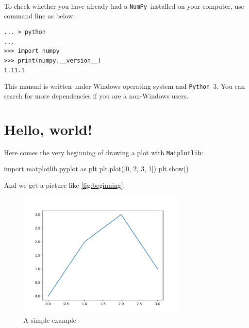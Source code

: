 \documentclass{report}
\newcommand{\pkg}[1]{\texttt{#1}}
\newcommand{\Py}{\pkg{Python}}
\newcommand{\NumPy}{\pkg{NumPy}}
\newcommand{\mpl}{\texttt{Matplotlib}}
\newcommand{\nextblock}{\vspace{2ex}}
\begin{document}
To check whether you have already had a \NumPy\ installed on your computer, use command line as below:
\begin{verbatim}
... > python
...
>>> import numpy
>>> print(numpy.__version__)
1.11.1
\end{verbatim}

\nextblock This manual is written under Windows operating system and \Py\ 3. You can search for more dependencies if you are a non-Windows users.

\section{Hello, world!}
Here comes the very beginning of drawing a plot with \mpl :
\begin{py}
import matplotlib.pyplot as plt
plt.plot([0, 2, 3, 1])
plt.show()
\end{py}

And we get a picture like \autoref{fig:beginning}:
\begin{figure}[!htb]
  \centering
  \includegraphics[height=2.5in]{beginning}
  \caption{A simple example}
  \label{fig:beginning}
\end{figure}
\end{document}
